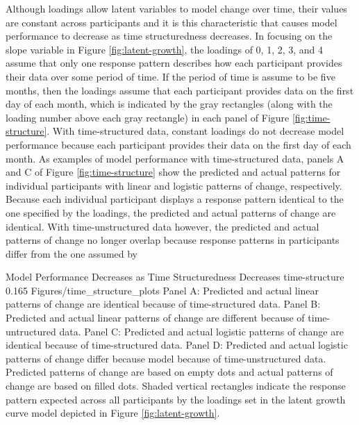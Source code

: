 \documentclass[
12pt, %
twoside,
english]{guelphthesis}
\begin{document}
Although loadings allow latent variables to model change over time, their values are constant across participants and it is this characteristic that causes model performance to decrease as time structuredness decreases. In focusing on the slope variable in Figure \ref{fig:latent-growth}, the loadings of 0, 1, 2, 3, and 4 assume that only one response pattern describes how each participant provides their data over some period of time. If the period of time is assume to be five months, then the loadings assume that each participant provides data on the first day of each month, which is indicated by the gray rectangles (along with the loading number above each gray rectangle) in each panel of Figure \ref{fig:time-structure}. With time-structured data, constant loadings do not decrease model performance because each participant provides their data on the first day of each month. As examples of model performance with time-structured data, panels A and C of Figure \ref{fig:time-structure} show the predicted and actual patterns for individual participants with linear and logistic patterns of change, respectively. Because each individual participant displays a response pattern identical to the one specified by the loadings, the predicted and actual patterns of change are identical. With time-unstructured data however, the predicted and actual patterns of change no longer overlap because response patterns in participants differ from the one assumed by
\begin{apaFigure}
[portrait]
[samepage]
[-0.2cm]
{Model Performance Decreases as Time Structuredness Decreases}
{time-structure}
{0.165}
{Figures/time_structure_plots}
{Panel A: Predicted and actual linear patterns of change are identical because of time-structured data. Panel B: Predicted and actual linear patterns of change are different because of time-untructured data. Panel C: Predicted and actual logistic patterns of change are identical because of time-structured data. Panel D: Predicted and actual logistic patterns of change differ because model because of time-unstructured data. Predicted patterns of change are based on empty dots and actual patterns of change are based on filled dots. Shaded vertical rectangles indicate the response pattern expected across all participants by the loadings set in the latent growth curve model depicted in Figure \ref{fig:latent-growth}.}
\end{apaFigure}
\end{document}
